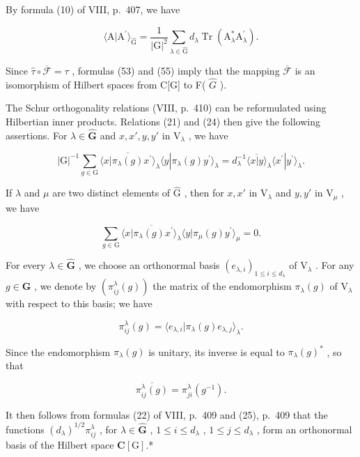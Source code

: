 By formula (10) of VIII, p.~407, we have

\[
\langle \mathrm{A} | \mathrm{A} ^ {\prime} \rangle_ {\widehat {\mathrm{G}}} = \frac {1}{| \mathrm{G} | ^ {2}} \sum_ {\lambda \in \widehat {\mathrm{G}}} d _ {\lambda} \operatorname{Tr} (\mathrm{A} _ {\lambda} ^ {*} \mathrm{A} _ {\lambda} ^ {\prime}).\tag{56}
\]

Since \(\hat{\tau}\circ\overline{{\mathcal{F}}}=\tau\) , formulas (53) and (55) imply that the mapping \(\overline{{\mathcal{F}}}\) is an isomorphism of Hilbert spaces from C{[}G{]} to F( \(\widehat{G}\) ).

The Schur orthogonality relations (VIII, p.~410) can be reformulated using Hilbertian inner products. Relations (21) and (24) then give the following assertions. For \(\lambda \in \widehat{\mathbf{G}}\) and \(x, x', y, y'\) in \(\mathrm{V}_{\lambda}\) , we have

\[
| \mathrm{G} | ^ {- 1} \sum_ {g \in \mathrm{G}} \overline {{\langle x | \pi_ {\lambda} (g) x ^ {\prime} \rangle}} _ {\lambda} \langle y | \pi_ {\lambda} (g) y ^ {\prime} \rangle_ {\lambda} = d _ {\lambda} ^ {- 1} \overline {{\langle x | y \rangle}} _ {\lambda} \langle x ^ {\prime} | y ^ {\prime} \rangle_ {\lambda}.\tag{57}
\]

If \(\lambda\) and \(\mu\) are two distinct elements of \(\widehat{\mathrm{G}}\) , then for \(x, x'\) in \(\mathrm{V}_{\lambda}\) and \(y, y'\) in \(\mathrm{V}_{\mu}\) , we have

\[
\sum_ {g \in \mathrm{G}} \overline {{\langle x | \pi_ {\lambda} (g) x ^ {\prime} \rangle_ {\lambda}}} \langle y | \pi_ {\mu} (g) y ^ {\prime} \rangle_ {\mu} = 0.\tag{58}
\]

For every \(\lambda \in \widehat{\mathbf{G}}\) , we choose an orthonormal basis \((e_{\lambda,i})_{1\leqslant i\leqslant d_{\lambda}}\) of \(\mathrm{V}_{\lambda}\) . For any \(g\in \mathbf{G}\) , we denote by \((\pi_{ij}^{\lambda}(g))\) the matrix of the endomorphism \(\pi_{\lambda}(g)\) of \(\mathrm{V}_{\lambda}\) with respect to this basis; we have

\[
\pi_ {i j} ^ {\lambda} (g) = \langle e _ {\lambda , i} | \pi_ {\lambda} (g) e _ {\lambda , j} \rangle_ {\lambda}.\tag{59}
\]

Since the endomorphism \(\pi_{\lambda}(g)\) is unitary, its inverse is equal to \(\pi_{\lambda}(g)^*\) , so that

\[
\overline {{\pi_ {i j} ^ {\lambda} (g)}} = \pi_ {j i} ^ {\lambda} (g ^ {- 1}).\tag{60}
\]

It then follows from formulas (22) of VIII, p.~409 and (25), p.~409 that the functions \((d_{\lambda})^{1 / 2}\pi_{ij}^{\lambda}\) , for \(\lambda \in \widehat{\mathbf{G}}\) , \(1\leqslant i\leqslant d_{\lambda}\) , \(1\leqslant j\leqslant d_{\lambda}\) , form an orthonormal basis of the Hilbert space \(\mathbf{C}[\mathrm{G}]\).*

